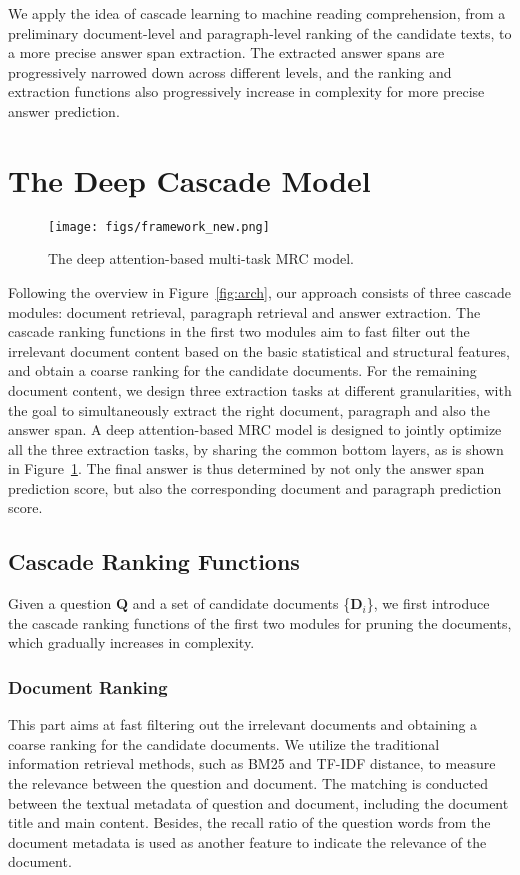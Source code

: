 \documentclass[letterpaper]{article} \usepackage{aaai19}  \usepackage{graphicx}
\begin{document}
We apply the idea of cascade learning to machine reading comprehension, from a preliminary document-level and paragraph-level ranking of the candidate texts, to a more precise answer span extraction. The extracted answer spans are progressively narrowed down across different levels, and the ranking and extraction functions also progressively increase in complexity for more precise answer prediction. 

\section{The Deep Cascade Model}

\begin{figure}
\centering
\texttt{[image: figs/framework\_new.png]}\vspace{-2mm}
\caption{The deep attention-based multi-task MRC model.}\vspace{-3mm}
\label{fig:cascade}
\end{figure}

Following the overview in Figure~\ref{fig:arch}, our approach consists of three cascade modules: document retrieval, paragraph retrieval and answer extraction. The cascade ranking functions in the first two modules aim to fast filter out the irrelevant document content based on the basic statistical and structural features, and obtain a coarse ranking for the candidate documents. For the remaining document content, we design three extraction tasks at different granularities, with the goal to simultaneously extract the right document, paragraph and also the answer span. A deep attention-based MRC model is designed to jointly optimize all the three extraction tasks, by sharing the common bottom layers, as is shown in Figure~\ref{fig:cascade}. The final answer is thus determined by not only the answer span prediction score, but also the corresponding document and paragraph prediction score. 

\subsection{Cascade Ranking Functions}
Given a question $\textbf{Q}$ and a set of candidate documents \{$\textbf{D}_i$\}, we first introduce the cascade ranking functions of the first two modules for pruning the documents, which gradually increases in complexity.  

\subsubsection{Document Ranking}
This part aims at fast filtering out the irrelevant documents and obtaining a coarse ranking for the candidate documents. We utilize the traditional information retrieval methods, such as BM25 and TF-IDF distance, to measure the relevance between the question and document. The matching is conducted between the textual metadata of question and document, including the document title and main content. Besides, the recall ratio of the question words from the document metadata is used as another feature to indicate the relevance of the document. 
\end{document}
